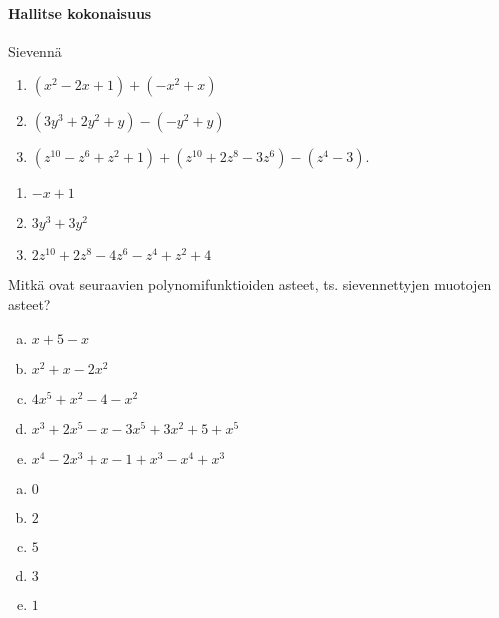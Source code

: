 \begin{tehtavasivu}
\paragraph*{Hallitse kokonaisuus}

\begin{tehtava}
    Sievennä
    \begin{enumerate}
        \item $(x^2 - 2x + 1) + (-x^2 + x) $
        \item $(3y^3 + 2y^2  + y) - (-y^2 + y)$
        \item $(z^{10} - z^6 + z^2 + 1) + (z^{10} + 2z^8 - 3z^6) - (z^4 - 3)$.
    \end{enumerate}
    \begin{vastaus}
        \begin{enumerate}
            \item $-x + 1$
            \item $3y^3 + 3y^2$
            \item $2z^{10} + 2z^8 - 4z^6 - z^4 + z^2 + 4$
        \end{enumerate}
    \end{vastaus}
\end{tehtava}

\begin{tehtava}
	Mitkä ovat seuraavien polynomifunktioiden asteet, ts. sievennettyjen muotojen asteet?
	\begin{enumerate}[a)]
		\item $x+5-x$
		\item $x^2+x-2x^2$
		\item $4x^5+x^2-4-x^2$
		\item $x^3+2x^5-x-3x^5+3x^2+5+x^5$
		\item $x^4-2x^3+x-1+x^3-x^4+x^3$
	\end{enumerate}

	\begin{vastaus}
		\begin{enumerate}[a)]
			\item $0$
			\item $2$
			\item $5$
			\item $3$
			\item $1$
		\end{enumerate}
	\end{vastaus}
\end{tehtava}


\end{tehtavasivu}
